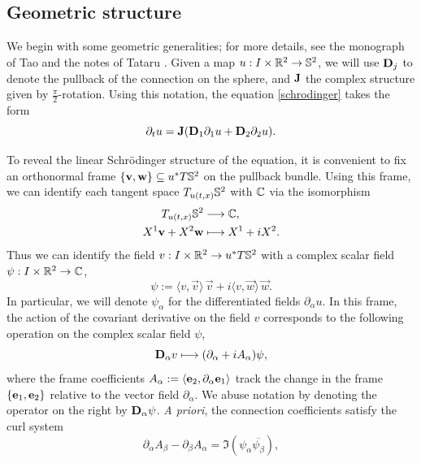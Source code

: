
\subsection{Geometric structure}

We begin with some geometric generalities; for more details, see the monograph of Tao \cite[Chapter 6.2]{Tao2006} and the notes of Tataru \cite[Geometric Dispersive Equations]{KochEtAl2014}.  Given a map $u : I \times \mathbb R^2 \to \mathbb S^2$, we will use ${\bf D}_j$ to denote the pullback of the connection on the sphere, and ${\bf J}$ the complex structure given by $\tfrac\pi2$-rotation. Using this notation, the equation \eqref{schrodinger} takes the form
\begin{equation}\label{eq:geoschrod}
        \partial_t u 
            = {\bf J} ({\bf D}_1 \partial_1 u + {\bf D}_2 \partial_2 u).
\end{equation}


To reveal the linear Schr\"odinger structure of the equation, it is convenient to fix an orthonormal frame $\{\mathbf v, \mathbf w\} \subseteq u^* T\mathbb S^2$ on the pullback bundle. Using this frame, we can identify each tangent space $T_{u(t, x)} \mathbb S^2$ with $\mathbb C$ via the isomorphism 
    \begin{align*}
        T_{u(t, x)} \mathbb S^2
            &\longrightarrow \mathbb C, \\
        X^1 \mathbf v + X^2 \mathbf w 
            &\longmapsto X^1 + i X^2.        
    \end{align*}
Thus we can identify the field $v : I \times \mathbb R^2 \to u^* T\mathbb S^2$ with a complex scalar field $\psi: I \times \mathbb R^2 \to \mathbb C$, 
    \[
        \psi 
            := \big\langle v, \vec v \big\rangle \, \vec v + i \big\langle v, \vec w \big\rangle \, \vec w.
    \]
In particular, we will denote $\psi_\alpha$ for the differentiated fields $\partial_\alpha u$. In this frame, the action of the covariant derivative on the field $v$ corresponds to the following operation on the complex scalar field $\psi$, 
    \[
        {\bf D}_\alpha v 
            \longmapsto (\partial_\alpha + i A_\alpha) \psi, 
    \]
where the frame coefficients $A_\alpha := \langle {\bf e}_2, \partial_\alpha {\bf e}_1 \rangle$ track the change in the frame $\{{\bf e}_1, {\bf e}_2\}$ relative to the vector field $\partial_\alpha$. We abuse notation by denoting the operator on the right by ${\bf D}_\alpha \psi$. \textit{A priori}, the connection coefficients satisfy the curl system 
    \begin{equation}\label{eq:curvature}
        \partial_\alpha A_\beta - \partial_\beta A_\alpha 
            = \Im (\psi_\alpha \overline{\psi_\beta}),
    \end{equation}

